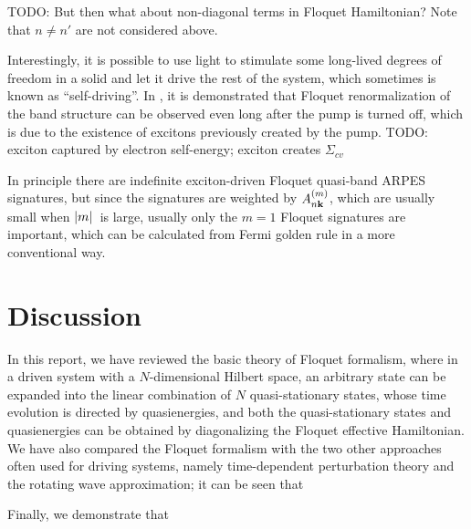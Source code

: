 \documentclass[hyperref, a4paper]{article}
\begin{document}
TODO: But then what about non-diagonal terms in Floquet Hamiltonian? Note that $n \neq n'$ are not considered above.

Interestingly, it is possible to use light to stimulate 
some long-lived degrees of freedom in a solid 
and let it drive the rest of the system, 
which sometimes is known as ``self-driving''.
In \cite{chan2023giant}, it is demonstrated that 
Floquet renormalization of the band structure can be observed 
even long after the pump is turned off, 
which is due to the existence of excitons previously created by the pump.
TODO: exciton captured by electron self-energy; 
exciton creates $\Sigma_{cv}$

In principle there are indefinite exciton-driven Floquet quasi-band ARPES signatures,
but since the signatures are weighted by $A^{(m)}_{n \vb{k}}$,
which are usually small when $\abs*{m}$ is large, 
usually only the $m=1$ Floquet signatures are important,
which can be calculated from Fermi golden rule in a more conventional way.


\section{Discussion}

In this report,
we have reviewed the basic theory of Floquet formalism, 
where in a driven system with a $N$-dimensional Hilbert space, 
an arbitrary state can be expanded into 
the linear combination of $N$ quasi-stationary states, 
whose time evolution is directed by quasienergies,
and both the quasi-stationary states and quasienergies can be obtained 
by diagonalizing the Floquet effective Hamiltonian.
We have also compared the Floquet formalism with the two other approaches often used for driving systems, 
namely time-dependent perturbation theory and the rotating wave approximation;
it can be seen that 

Finally, we demonstrate that 

\printbibliography
\end{document}
